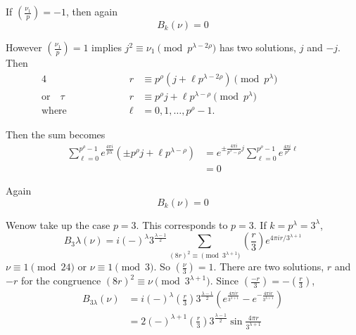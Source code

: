 If $\left(\frac{\nu_1}{p} \right)=- 1$, then again 
\begin{equation*}
  B_k (\nu)=0 \tag{7}\label{part3:lec25:eq7}
\end{equation*}

However $\left(\frac{\nu_1}{p} \right)=1$ implies $j^2 \equiv \nu_1
\pmod{p^{\lambda- 2\rho}}$ has two solutions, $j$ and $-j$. Then
\begin{alignat*}{4}
  &\hspace{2cm}& r & \equiv p^\rho \left(j + \ell p^{\lambda- 2 \rho}\right)
  \pmod{p^\lambda}\hspace{2cm}\\
  \text{or} \quad \tau && r & \equiv p^\rho j + \ell p ^{\lambda -
    \rho} \pmod{p^\lambda}\\
  \text{where} && \ell & = 0, 1, \ldots, p^\rho -1.
\end{alignat*}

Then the sum becomes
\begin{align*}
  \sum^{p^\rho -1}_{\ell =0} e^{\frac{4 \pi i}{p \lambda}} (\pm p^\rho
  j + \ell p^{\lambda- \rho}) & = e^{\pm \frac{4 \pi i}{p^\lambda-
      \rho}j} \sum^{p^\rho -1}_{\ell =0} e^{\frac{4 \pi i}{p^\rho}
    \ell}\\
    & = 0
\end{align*}

Again 
\begin{equation*}
  B_k (\nu) =0 \tag{8}\label{part3:lec25:eq8}
\end{equation*}

We\pageoriginale now take up the case $p=3$. This corresponds to
$p=3$. If $k=p^\lambda=3^\lambda$,
$$
B_3 \lambda (\nu) = i (-)^\lambda 3^{\frac{\lambda-1}{2}}
\sum_{(8 r)^2 \equiv \pmod{3^{\lambda+1}}} \left(
\frac{r}{3}\right) e^{4 \pi i r/ 3^{\lambda+1}}
$$
$\nu\equiv 1 \pmod{24}$ or $\nu\equiv 1 \pmod{3}$. So
$\left(\frac{\nu}{3} \right)=1$. There are two solutions, $r$ and $-r$
for the congruence $(8r)^2 \equiv \nu \pmod{3^{\lambda+1}}$. Since
$\left( \frac{-r}{3}\right)=- \left( \frac{r}{3}\right)$, 
\begin{align*}
  B_{3 \lambda} (\nu) & = i(-)^\lambda \left( \frac{r}{3}\right)
  3^{\frac{\lambda-1}{2}} \left(e^{\frac{4\pi i r}{3^{\lambda+1}}}-e^{-
      \frac{4 \pi i r}{3^{\lambda+1}}} \right) \\
    & = 2(-)^{\lambda+1} \left( \frac{r}{3}\right)
    3^{\frac{\lambda-1}{2}} \sin \frac{4 \pi
      r}{3^{\lambda+1}}\tag{9}\label{part3:lec25:eq9}  
\end{align*}

